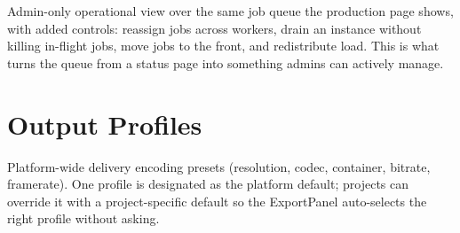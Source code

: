 Admin-only operational view over the same job queue the production page shows,
with added controls: reassign jobs across workers, drain an instance without
killing in-flight jobs, move jobs to the front, and redistribute load. This is
what turns the queue from a status page into something admins can actively
manage.


\begin{itemize}
\end{itemize}

\section{Output Profiles}
\label{sec:admin-output-profiles}

Platform-wide delivery encoding presets (resolution, codec, container, bitrate,
framerate). One profile is designated as the platform default; projects can
override it with a project-specific default so the ExportPanel auto-selects
the right profile without asking.


\begin{itemize}
\end{itemize}


